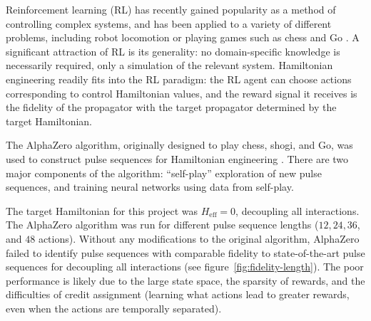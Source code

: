 \documentclass{article}
\begin{document}
Reinforcement learning (RL) has recently gained popularity as a method of controlling complex systems, and has been applied to a variety of different problems, including robot locomotion \cite{lillicrap2015continuous} or playing games such as chess and Go \cite{Silver1140}. A significant attraction of RL is its generality: no domain-specific knowledge is necessarily required, only a simulation of the relevant system.
Hamiltonian engineering readily fits into the RL paradigm: the RL agent can choose actions corresponding to control Hamiltonian values, and the reward signal it receives is the fidelity of the propagator with the target propagator determined by the target Hamiltonian.

The AlphaZero algorithm, originally designed to play chess, shogi, and Go, was used to construct pulse sequences for Hamiltonian engineering \cite{Silver1140}. There are two major components of the algorithm: ``self-play'' exploration of new pulse sequences, and training neural networks using data from self-play.

%     

The target Hamiltonian for this project was $H_{\text{eff}} = 0$, decoupling all interactions.
The AlphaZero algorithm was run for different pulse sequence lengths ($12, 24, 36$, and $48$ actions).
Without any modifications to the original algorithm, AlphaZero failed to identify pulse sequences with comparable fidelity to state-of-the-art pulse sequences for decoupling all interactions (see figure~\ref{fig:fidelity-length}).
The poor performance is likely due to the large state space, the sparsity of rewards, and the difficulties of credit assignment (learning what actions lead to greater rewards, even when the actions are temporally separated).
\end{document}
